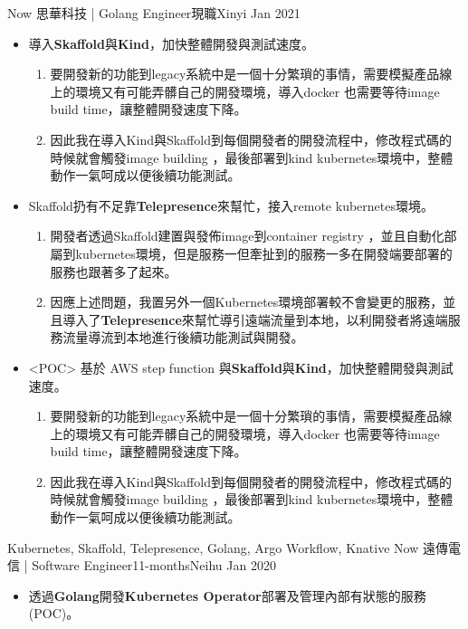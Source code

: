 \begin{experiences}
	\experience
	{Now}   {思華科技 | Golang Engineer}{現職}{Xinyi}
	{Jan 2021} {
		\begin{itemize}
			\item 導入\textbf{Skaffold}與\textbf{Kind}，加快整體開發與測試速度。
			\begin{enumerate}                      	
				\item 要開發新的功能到legacy系統中是一個十分繁瑣的事情，需要模擬產品線上的環境又有可能弄髒自己的開發環境，導入docker 也需要等待image build time，讓整體開發速度下降。
				\item 因此我在導入Kind與Skaffold到每個開發者的開發流程中，修改程式碼的時候就會觸發image building ，最後部署到kind  kubernetes環境中，整體動作一氣呵成以便後續功能測試。
			\end{enumerate}
			\item Skaffold扔有不足靠\textbf{Telepresence}來幫忙，接入remote kubernetes環境。
			\begin{enumerate}
				\item 開發者透過Skaffold建置與發佈image到container registry ，並且自動化部屬到kubernetes環境，但是服務一但牽扯到的服務一多在開發端要部署的服務也跟著多了起來。
				\item 因應上述問題，我置另外一個Kubernetes環境部署較不會變更的服務，並且導入了\textbf{Telepresence}來幫忙導引遠端流量到本地，以利開發者將遠端服務流量導流到本地進行後續功能測試與開發。
			\end{enumerate}
			\item <POC> 基於 AWS step function 與\textbf{Skaffold}與\textbf{Kind}，加快整體開發與測試速度。
			\begin{enumerate}                      	
				\item 要開發新的功能到legacy系統中是一個十分繁瑣的事情，需要模擬產品線上的環境又有可能弄髒自己的開發環境，導入docker 也需要等待image build time，讓整體開發速度下降。
				\item 因此我在導入Kind與Skaffold到每個開發者的開發流程中，修改程式碼的時候就會觸發image building ，最後部署到kind  kubernetes環境中，整體動作一氣呵成以便後續功能測試。
			\end{enumerate}
		\end{itemize}
	}
	{Kubernetes, Skaffold, Telepresence, Golang, Argo Workflow, Knative}
	\emptySeparator
  \experience
    {Now}   {遠傳電信 | Software Engineer}{11-months}{Neihu}
    {Jan 2020} {
                      \begin{itemize}
                        \item 透過\textbf{Golang}開發\textbf{Kubernetes Operator}部署及管理內部有狀態的服務 (POC)。

\end{itemize}}
\end{experiences}
